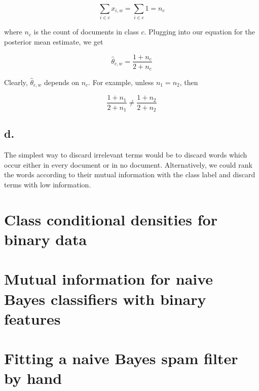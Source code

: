 \documentclass{article}
\begin{document}
\begin{equation*}
  \sum_{i \in c} x_{i,w} = \sum_{i \in c} 1 = n_c
\end{equation*}

where $n_c$ is the count of documents in class $c$. Plugging into our
equation for the posterior mean estimate, we get

\begin{equation*}
  \hat{\theta}_{c,w} = \frac{1 + n_c}{2 + n_c}
\end{equation*}

Clearly, $\hat{\theta}_{c,w}$ depends on $n_c$. For example, unless
$n_1 = n_2$, then

\begin{equation*}
  \frac{1 + n_1}{2 + n_1} \neq \frac{1 + n_2}{2 + n_2}
\end{equation*}

\subsection{d.}

The simplest way to discard irrelevant terms would be to discard words
which occur either in every document or in no document. Alternatively,
we could rank the words according to their mutual information with the
class label and discard terms with low information.

\section{Class conditional densities for binary data}

\section{Mutual information for naive Bayes classifiers with binary features}

\section{Fitting a naive Bayes spam filter by hand}
\end{document}
